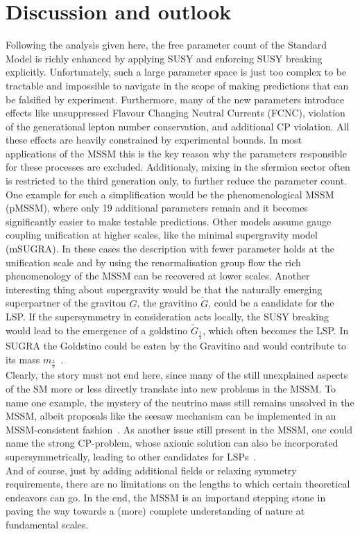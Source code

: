 
\section{Discussion and outlook}\label{disc}
Following the analysis given here, the free parameter count of the Standard Model is richly enhanced by applying SUSY and enforcing SUSY breaking explicitly. Unfortunately, such a large parameter space is just too complex to be tractable and impossible to navigate in the scope of making predictions that can be falsified by experiment. Furthermore, many of the new parameters introduce effects like unsuppressed Flavour Changing Neutral Currents (FCNC), violation of the generational lepton number conservation, and additional CP violation. All these effects are heavily constrained by experimental bounds. In most applications of the MSSM this is the key reason why the parameters responsible for these processes are excluded. Additionaly, mixing in the sfermion sector often is restricted to the third generation only, to further reduce the parameter count. One example for such a simplification would be the phenomenological MSSM (pMSSM), where only 19 additional parameters remain and it becomes significantly easier to make testable predictions. Other models assume gauge coupling unification at higher scales, like the minimal supergravity model (mSUGRA). In these cases the description with fewer parameter holds at the unification scale and by using the renormalisation group flow the rich phenomenology of the MSSM can be recovered at lower scales. Another interesting thing about supergravity would be that the naturally emerging superpartner of the graviton $G$, the gravitino $\tilde{G}$, could be a candidate for the LSP. If the supersymmetry in consideration acts locally, the SUSY breaking would lead to the emergence of a goldstino $\tilde{G}_{\frac12}$, which often becomes the LSP. In SUGRA the Goldstino could be eaten by the Gravitino and would contribute to its mass $m_{\frac32}$~\cite{pdg, primer}.\\
Clearly, the story must not end here, since many of the still unexplained aspects of the SM more or less directly translate into new problems in the MSSM. To name one example, the mystery of the neutrino mass still remains unsolved in the MSSM, albeit proposals like the seesaw mechanism can be implemented in an MSSM-consistent fashion~\cite{pdg}. As another issue still present in the MSSM, one could name the strong CP-problem, whose axionic solution can also be incorporated supersymmetrically, leading to other candidates for LSPs~\cite{pq, primer, chung}.\\
And of course, just by adding additional fields or relaxing symmetry requirements, there are no limitations on the lengths to which certain theoretical endeavors can go. In the end, the MSSM is an importand stepping stone in paving the way towards a (more) complete understanding of nature at fundamental scales.